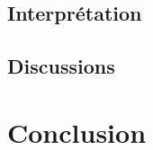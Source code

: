 \documentclass[a4paper,12pt,oneside]{article}
\begin{document}
\subsection{Interprétation}

\subsection{Discussions}
\section{Conclusion}






\begin{thebibliography}{99}
\end{thebibliography}
\end{document}
